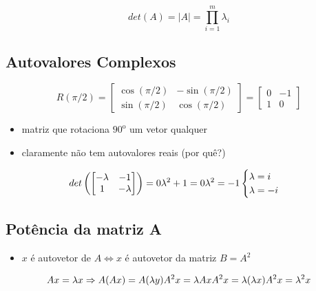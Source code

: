 \documentclass[
  letterpaper,
  DIV=11,
  numbers=noendperiod]{scrartcl}
\providecommand{\tightlist}{%
  \setlength{\itemsep}{0pt}\setlength{\parskip}{0pt}}\usepackage{longtable,booktabs,array}
\begin{document}
\[ det(A) = \mid A \mid = \prod_{i=1}^m \lambda_i\]

\hypertarget{autovalores-complexos}{%
\subsection{Autovalores Complexos}\label{autovalores-complexos}}

\[ R(\pi/2) = \begin{bmatrix}\cos(\pi/2)& -\sin(\pi/2)\\ \sin(\pi/2) & \cos(\pi/2)\end{bmatrix} = \begin{bmatrix}0 & -1 \\ 1 & 0\end{bmatrix}\]

\usepackage{gensymb}

\begin{itemize}
\tightlist
\item
  matriz que rotaciona \(90^\text{o}\) um vetor qualquer
\item
  claramente não tem autovalores reais (por quê?)
\end{itemize}

\[ det \left( \begin{bmatrix}-\lambda&-1\\1&-\lambda\end{bmatrix} \right) = 0 \\ \lambda^2 + 1 =0 \\ \lambda^2 = -1 \\ \begin{cases}\lambda = i\\ \lambda = -i\end{cases}\]

\hypertarget{potuxeancia-da-matriz-a}{%
\subsection{Potência da matriz A}\label{potuxeancia-da-matriz-a}}

\begin{itemize}
\tightlist
\item
  \(x\) é autovetor de \(A \Leftrightarrow x\) é autovetor da matriz
  \(B = A^2\)
\end{itemize}

\begin{tcolorbox}[enhanced jigsaw, arc=.35mm, opacityback=0, bottomtitle=1mm, left=2mm, coltitle=black, rightrule=.15mm, colbacktitle=quarto-callout-note-color!10!white, breakable, opacitybacktitle=0.6, bottomrule=.15mm, title=\textcolor{quarto-callout-note-color}{\faInfo}\hspace{0.5em}{Prova}, titlerule=0mm, colframe=quarto-callout-note-color-frame, toprule=.15mm, toptitle=1mm, leftrule=.75mm, colback=white]
\begin{equation}
Ax = \lambda x \Rightarrow A(Ax) = A(\lambda y)\\
A^2x = \lambda Ax\\
A^2x = \lambda (\lambda x)\\
A^2x = \lambda^2 x
\end{equation}
\end{tcolorbox}
\end{document}
